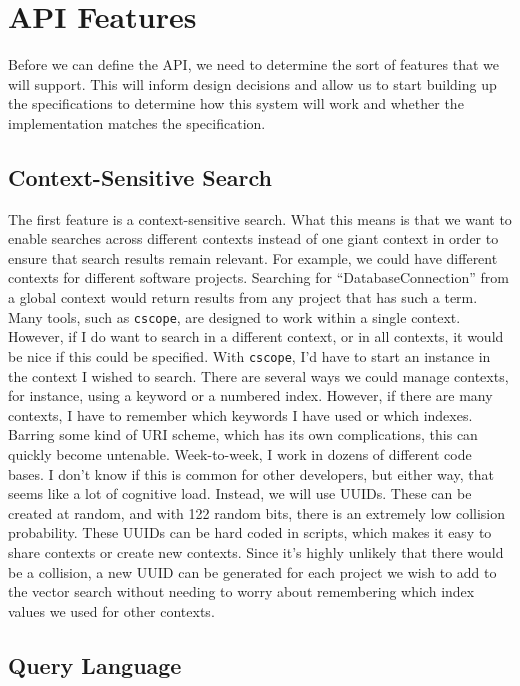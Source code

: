 \section{API Features}

Before we can define the API, we need to determine the sort of features that we
will support. This will inform design decisions and allow us to start building
up the specifications to determine how this system will work and whether the
implementation matches the specification.

\subsection{Context-Sensitive Search}

The first feature is a context-sensitive search.  What this means
is that we want to enable searches across different contexts instead of one
giant context in order to ensure that search results remain relevant.  For
example, we could have different contexts for different software projects.
Searching for ``DatabaseConnection'' from a global context would return results
from any project that has such a term.  Many tools, such as \verb/cscope/, are
designed to work within a single context.  However, if I do want to search in a
different context, or in all contexts, it would be nice if this could be
specified.  With \verb/cscope/, I'd have to start an instance in the context I
wished to search.  There are several ways we could manage contexts, for
instance, using a keyword or a numbered index.  However, if there are many
contexts, I have to remember which keywords I have used or which indexes.
Barring some kind of URI scheme, which has its own complications, this can
quickly become untenable.  Week-to-week, I work in dozens of different code
bases.  I don't know if this is common for other developers, but either way,
that seems like a lot of cognitive load.  Instead, we will use UUIDs.  These can
be created at random, and with 122 random bits, there is an extremely low
collision probability.  These UUIDs can be hard coded in scripts, which makes it
easy to share contexts or create new contexts.  Since it's highly unlikely that
there would be a collision, a new UUID can be generated for each project we wish
to add to the vector search without needing to worry about remembering which
index values we used for other contexts.

\subsection{Query Language}


